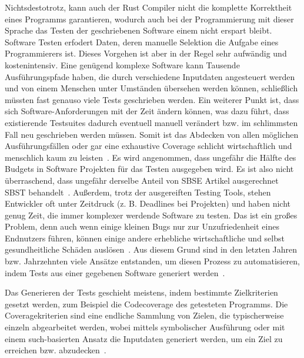 \documentclass{article}
\begin{document}
Nichtsdestotrotz, kann auch der Rust Compiler nicht die komplette Korrektheit eines Programms garantieren, wodurch auch bei der Programmierung mit dieser Sprache das Testen der geschriebenen Software einem nicht erspart bleibt. Software Testen erfodert Daten, deren manuelle Selektion die Aufgabe eines Programmierers ist. Dieses Vorgehen ist aber in der Regel sehr aufwändig und kostenintensiv. Eine genügend komplexe Software kann Tausende Ausführungspfade haben, die durch verschiedene Inputdaten angesteuert werden und von einem Menschen unter Umständen übersehen werden können, schließlich müssten fast genauso viele Tests geschrieben werden. Ein weiterer Punkt ist, dass sich Software-Anforderungen mit der Zeit ändern können, was dazu führt, dass existierende Testsuites dadurch eventuell manuell verändert bzw. im schlimmsten Fall neu geschrieben werden müssen. Somit ist das Abdecken von allen möglichen Ausführungsfällen oder gar eine exhaustive Coverage schlicht wirtschaftlich und menschlich kaum zu leisten~\cite{Myers2012}. Es wird angenommen, dass ungefähr die Hälfte des Budgets in Software Projekten für das Testen ausgegeben wird. Es ist also nicht überraschend, dass ungefähr derselbe Anteil von SBSE Artikel ausgerechnet SBST behandelt~\cite{Harman2015}. Außerdem, trotz der ausgereiften Testing Tools, stehen Entwickler oft unter Zeitdruck (z. B. Deadlines bei Projekten) und haben nicht genug Zeit, die immer komplexer werdende Software zu testen. Das ist ein großes Problem, denn auch wenn einige kleinen Bugs nur zur Unzufriedenheit eines Endnutzers führen, können einige andere erhebliche wirtschaftliche und selbst gesundheitliche Schäden auslösen~\cite{Myers2012}.  Aus diesem Grund sind in den letzten Jahren bzw. Jahrzehnten viele Ansätze entstanden, um diesen Prozess zu automatisieren, indem Tests aus einer gegebenen Software generiert werden~\cite{McMinn_2004}. 

Das Generieren der Tests geschieht meistens, indem bestimmte Zielkriterien gesetzt werden, zum Beispiel die Codecoverage des getesteten Programms. Die Coveragekriterien sind eine endliche Sammlung von Zielen, die typischerweise einzeln abgearbeitet werden, wobei mittels symbolischer Ausführung oder mit einem such-basierten Ansatz die Inputdaten generiert werden, um ein Ziel zu erreichen bzw. abzudecken~\cite{Fraser_2013}.  
\end{document}
